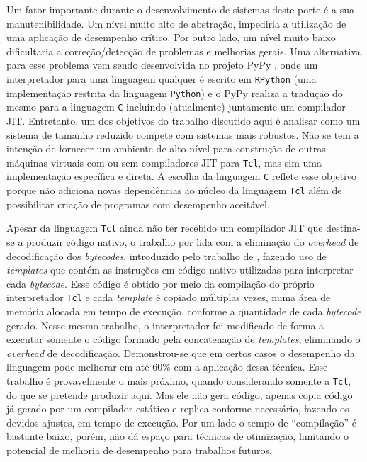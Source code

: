 Um fator importante durante o desenvolvimento de sistemas deste porte
é a sua manutenibilidade. Um nível muito alto de abstração,
impediria a utilização de uma aplicação de desempenho crítico.
Por outro lado, um nível muito baixo dificultaria a correção/detecção de
problemas e melhorias gerais.
Uma alternativa para esse problema vem sendo desenvolvida no
projeto PyPy \cite{pypy}, onde um interpretador para uma linguagem
qualquer é escrito em \texttt{RPython} \cite{rpython} (uma implementação
restrita da linguagem \texttt{Python}) e o PyPy realiza a tradução do
mesmo para a
linguagem \texttt{C} incluindo (atualmente) juntamente um compilador
JIT. Entretanto, um
dos objetivos do trabalho discutido aqui é analisar como um sistema de
tamanho reduzido compete com sistemas mais robustos. Não se tem a
intenção de fornecer um ambiente de alto nível para construção de
outras máquinas virtuais com ou sem compiladores JIT para
\texttt{Tcl}, mas sim uma implementação específica e direta.
A escolha da
linguagem \texttt{C} reflete esse objetivo porque não adiciona novas
dependências ao núcleo da linguagem \texttt{Tcl} além de possibilitar
criação de programas com desempenho aceitável.

Apesar da linguagem \texttt{Tcl} ainda não ter recebido um compilador
JIT que destina-se a produzir código nativo, o trabalho por
 lida
com a eliminação do \textit{overhead} de decodificação dos
\textit{bytecodes}, introduzido pelo trabalho de ,
fazendo uso de \textit{templates} que contém as instruções em
código nativo utilizadas para interpretar cada \textit{bytecode}.
Esse código é
obtido por meio da compilação do próprio interpretador
\texttt{Tcl} e cada \textit{template} é copiado múltiplas vezes,
numa área de memória alocada em tempo de execução, conforme a quantidade de
cada \textit{bytecode} gerado. Nesse mesmo trabalho, o interpretador foi
modificado de forma a executar somente o código formado pela
concatenação de \textit{templates}, eliminando o \textit{overhead} de
decodificação. Demonstrou-se que em certos casos o desempenho da
linguagem pode melhorar em até 60\% com a aplicação dessa técnica.
Esse trabalho é provavelmente o mais próximo, quando considerando
somente a \texttt{Tcl}, do que se pretende produzir aqui.
Mas ele não gera código, apenas copia código já gerado por um compilador
estático e replica conforme necessário, fazendo os devidos
ajustes, em tempo de execução. Por um lado o tempo de ``compilação'' é
bastante baixo, porém, não dá espaço para técnicas de otimização,
limitando o potencial de melhoria de desempenho para trabalhos futuros.

